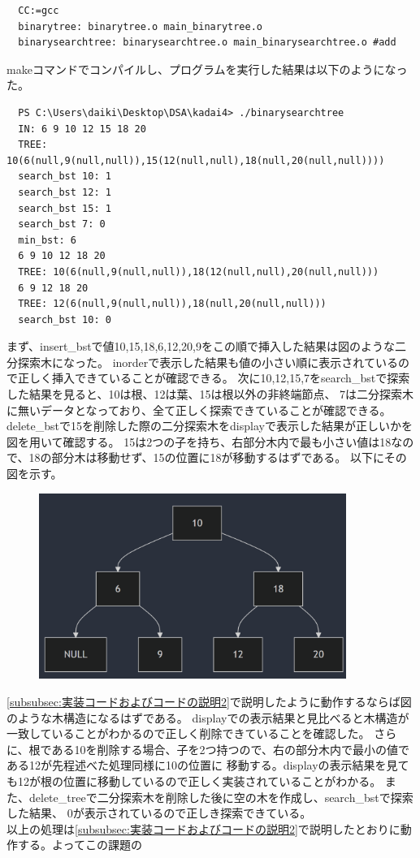 \documentclass{ltjsarticle}
\begin{document}
\begin{lstlisting}
  CC:=gcc
  binarytree: binarytree.o main_binarytree.o
  binarysearchtree: binarysearchtree.o main_binarysearchtree.o #add
\end{lstlisting}
makeコマンドでコンパイルし、プログラムを実行した結果は以下のようになった。
\begin{lstlisting}
  PS C:\Users\daiki\Desktop\DSA\kadai4> ./binarysearchtree   
  IN: 6 9 10 12 15 18 20 
  TREE: 10(6(null,9(null,null)),15(12(null,null),18(null,20(null,null))))
  search_bst 10: 1
  search_bst 12: 1
  search_bst 15: 1
  search_bst 7: 0
  min_bst: 6
  6 9 10 12 18 20
  TREE: 10(6(null,9(null,null)),18(12(null,null),20(null,null)))
  6 9 12 18 20
  TREE: 12(6(null,9(null,null)),18(null,20(null,null)))
  search_bst 10: 0
\end{lstlisting}
まず、insert\_bstで値10,15,18,6,12,20,9をこの順で挿入した結果は図のような二分探索木になった。
inorderで表示した結果も値の小さい順に表示されているので正しく挿入できていることが確認できる。
次に10,12,15,7をsearch\_bstで探索した結果を見ると、10は根、12は葉、15は根以外の非終端節点、
7は二分探索木に無いデータとなっており、全て正しく探索できていることが確認できる。\\
delete\_bstで15を削除した際の二分探索木をdisplayで表示した結果が正しいかを図を用いて確認する。
15は2つの子を持ち、右部分木内で最も小さい値は18なので、18の部分木は移動せず、15の位置に18が移動するはずである。
以下にその図を示す。
\begin{figure}[htbp]
  \begin{center}
      \includegraphics[width = 100mm]{binarysearchtree2.png}
  \end{center}
\end{figure}
\ref{subsubsec:実装コードおよびコードの説明2}で説明したように動作するならば図のような木構造になるはずである。
displayでの表示結果と見比べると木構造が一致していることがわかるので正しく削除できていることを確認した。
さらに、根である10を削除する場合、子を2つ持つので、右の部分木内で最小の値である12が先程述べた処理同様に10の位置に
移動する。displayの表示結果を見ても12が根の位置に移動しているので正しく実装されていることがわかる。
また、delete\_treeで二分探索木を削除した後に空の木を作成し、search\_bstで探索した結果、
0が表示されているので正しき探索できている。\\
以上の処理は\ref{subsubsec:実装コードおよびコードの説明2}で説明したとおりに動作する。よってこの課題の
\end{document}
